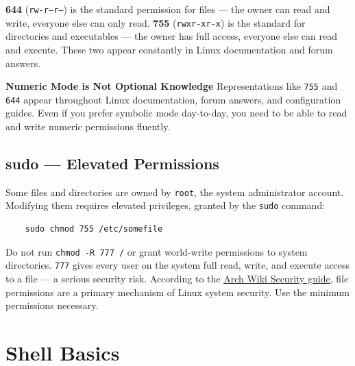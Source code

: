 \documentclass{article}
\newcommand{\code}[1]{\colorbox{codebg}{\texttt{#1}}}
\begin{document}
\begin{tcolorbox}[arc=12pt, outer arc=10pt,
	colback=blue!4!white, colframe=blue!40!black,
	title=\textbf{644 and 755 --- The Two You Will See Everywhere}]
	\textbf{644} (\code{rw-r--r--}) is the standard permission for files --- the
	owner can read and write, everyone else can only read. \textbf{755}
	(\code{rwxr-xr-x}) is the standard for directories and executables --- the
	owner has full access, everyone else can read and execute. These two appear
	constantly in Linux documentation and forum answers.
\end{tcolorbox}

\begin{callout}{\textbf{Numeric Mode is Not Optional Knowledge}}
	Representations like \code{755} and \code{644} appear throughout Linux
	documentation, forum answers, and configuration guides. Even if you prefer
	symbolic mode day-to-day, you need to be able to read and write numeric
	permissions fluently.
\end{callout}

\subsection{sudo --- Elevated Permissions}

Some files and directories are owned by \code{root}, the system administrator
account. Modifying them requires elevated privileges, granted by the \code{sudo}
command:

\begin{verbatim}
	sudo chmod 755 /etc/somefile
\end{verbatim}

\begin{tcolorbox}[arc=12pt, outer arc=10pt,
	colback=red!5!white, colframe=red!60!black,
	title=\textbf{Warning}]
	Do not run \code{chmod -R 777 /} or grant world-write permissions to system
	directories. \code{777} gives every user on the system full read, write, and
	execute access to a file --- a serious security risk. According to the
	\href{https://wiki.archlinux.org/title/Security}{Arch Wiki Security guide}, file
	permissions are a primary mechanism of Linux system security. Use the minimum
	permissions necessary.
\end{tcolorbox}

\newpage
\section{Shell Basics}
\end{document}
